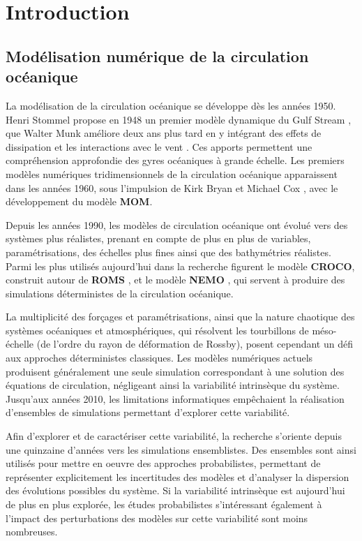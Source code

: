 \chapter{Introduction}

\section{Modélisation numérique de la circulation océanique}

La modélisation de la circulation océanique se développe dès les années 1950. Henri Stommel propose en 1948 un premier modèle dynamique du Gulf Stream \cite{stommel_westward_1948}, que Walter Munk améliore deux ans plus tard en y intégrant des effets de dissipation et les interactions avec le vent \cite{munk_wind-driven_1950}. Ces apports permettent une compréhension approfondie des gyres océaniques à grande échelle. Les premiers modèles numériques tridimensionnels de la circulation océanique apparaissent dans les années 1960, sous l’impulsion de Kirk Bryan et Michael Cox \cite{bryan_nonlinear_1968, bryan_nonlinear_1968-1}, avec le développement du modèle \textbf{MOM}.

Depuis les années 1990, les modèles de circulation océanique ont évolué vers des systèmes plus réalistes, prenant en compte de plus en plus de variables, paramétrisations, des échelles plus fines ainsi que des bathymétries réalistes. Parmi les plus utilisés aujourd’hui dans la recherche figurent le modèle \textbf{CROCO}, construit autour de \textbf{ROMS} \cite{moore_regional_2011}, et le modèle \textbf{NEMO} \cite{madec_ocean_1997}, qui servent à produire des simulations déterministes de la circulation océanique.

La multiplicité des forçages et paramétrisations, ainsi que la nature chaotique des systèmes océaniques et atmosphériques, qui résolvent les tourbillons de méso-échelle (de l'ordre du rayon de déformation de Rossby), posent cependant un défi aux approches déterministes classiques. Les modèles numériques actuels produisent généralement une seule simulation correspondant à une solution des équations de circulation, négligeant ainsi la variabilité intrinsèque du système. Jusqu’aux années 2010, les limitations informatiques empêchaient la réalisation d’ensembles de simulations permettant d’explorer cette variabilité.

Afin d'explorer et de caractériser cette variabilité, la recherche s’oriente depuis une quinzaine d’années vers les simulations ensemblistes. Des ensembles sont ainsi utilisés pour mettre en oeuvre des approches probabilistes, permettant de représenter explicitement les incertitudes des modèles et d’analyser la dispersion des évolutions possibles du système. Si la variabilité intrinsèque est aujourd'hui de plus en plus explorée, les études probabilistes s'intéressant également à l'impact des perturbations des modèles sur cette variabilité sont moins nombreuses.

